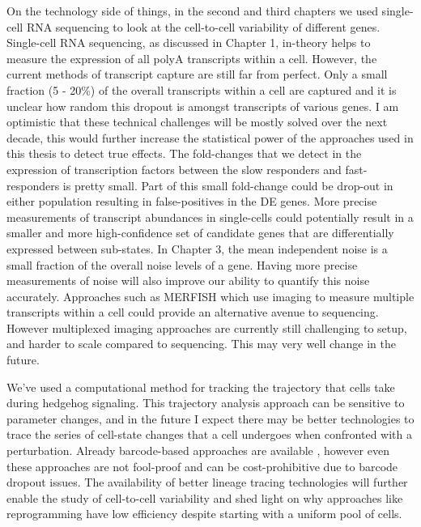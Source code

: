 On the technology side of things, in the second and third chapters we  used single-cell RNA sequencing to look at the cell-to-cell variability of different genes. Single-cell RNA sequencing, as discussed in Chapter 1, in-theory helps to measure the expression of all polyA transcripts within a cell. However, the current methods of transcript capture are still far from perfect. Only a small fraction (5 - 20\%) of the overall transcripts within a cell are captured \cite{battich_control_2015} and it is unclear how random this dropout is amongst transcripts of various genes. I am optimistic that these technical challenges will be mostly solved over the next decade, this would further increase the statistical power of the approaches used in this thesis to detect true effects. The fold-changes that we detect in the expression of transcription factors between the slow responders and fast-responders is pretty small. Part of this small fold-change could be drop-out in either population resulting in false-positives in the DE genes. More precise measurements of transcript abundances in single-cells could potentially result in a smaller and more high-confidence set of candidate genes that are differentially expressed between sub-states. In Chapter 3, the mean independent noise is a small fraction of the overall noise levels of a gene. Having more precise measurements of noise will also improve our ability to quantify this noise accurately. Approaches such as MERFISH \cite{xia2019pnasu} which use imaging to measure multiple transcripts within a cell could provide an alternative avenue to sequencing. However multiplexed imaging approaches are currently still challenging to setup, and harder to scale compared to sequencing. This may very well change in the future.

We've used a computational method for tracking the trajectory that cells take during hedgehog signaling. This trajectory analysis approach can be sensitive to parameter changes, and in the future I expect there may be better technologies to trace the series of cell-state changes that a cell undergoes when confronted with a perturbation. Already barcode-based approaches are available \cite{Biddy2018-ct} \cite{moudgil2020c}, however even these approaches are not fool-proof and can be cost-prohibitive due to barcode dropout issues. The availability of better lineage tracing technologies will further enable the study of cell-to-cell variability and shed light on why approaches like reprogramming have low efficiency despite starting with a uniform pool of cells.

